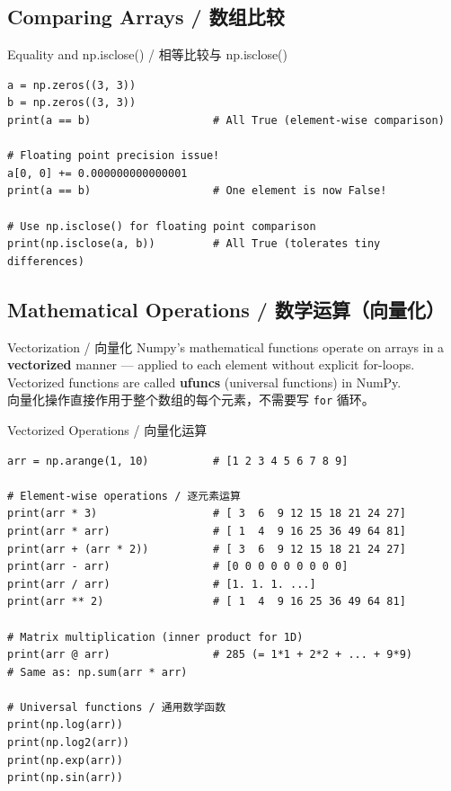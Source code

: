 \documentclass[11pt,a4paper]{article}
\begin{document}
\subsection{Comparing Arrays / 数组比较}

\begin{examplebox}{Equality and np.isclose() / 相等比较与 np.isclose()}
\begin{lstlisting}
a = np.zeros((3, 3))
b = np.zeros((3, 3))
print(a == b)                   # All True (element-wise comparison)

# Floating point precision issue!
a[0, 0] += 0.000000000000001
print(a == b)                   # One element is now False!

# Use np.isclose() for floating point comparison
print(np.isclose(a, b))         # All True (tolerates tiny differences)
\end{lstlisting}
\end{examplebox}

\subsection{Mathematical Operations / 数学运算（向量化）}

\begin{concept}{Vectorization / 向量化}
    Numpy's mathematical functions operate on arrays in a \textbf{vectorized} manner — applied to each element without explicit for-loops. Vectorized functions are called \textbf{ufuncs} (universal functions) in NumPy. \\
    向量化操作直接作用于整个数组的每个元素，不需要写 \texttt{for} 循环。
\end{concept}

\begin{examplebox}{Vectorized Operations / 向量化运算}
\begin{lstlisting}
arr = np.arange(1, 10)          # [1 2 3 4 5 6 7 8 9]

# Element-wise operations / 逐元素运算
print(arr * 3)                  # [ 3  6  9 12 15 18 21 24 27]
print(arr * arr)                # [ 1  4  9 16 25 36 49 64 81]
print(arr + (arr * 2))          # [ 3  6  9 12 15 18 21 24 27]
print(arr - arr)                # [0 0 0 0 0 0 0 0 0]
print(arr / arr)                # [1. 1. 1. ...]
print(arr ** 2)                 # [ 1  4  9 16 25 36 49 64 81]

# Matrix multiplication (inner product for 1D)
print(arr @ arr)                # 285 (= 1*1 + 2*2 + ... + 9*9)
# Same as: np.sum(arr * arr)

# Universal functions / 通用数学函数
print(np.log(arr))
print(np.log2(arr))
print(np.exp(arr))
print(np.sin(arr))
\end{lstlisting}
\end{examplebox}
\end{document}
